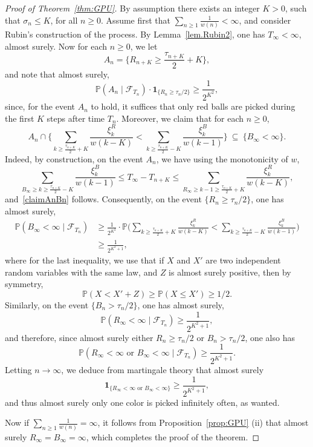 \documentclass[11pt]{article}
\newcommand{\1}{{\text{\Large $\mathfrak 1$}}}
\begin{document}
\begin{proof}[Proof of Theorem~\ref{thm:GPU}]
By assumption there exists an integer $K>0$, such that $\sigma_n\le K$, for all $n\ge 0$. Assume first that $\sum_{n\ge 1} \frac 1{w(n)}<\infty$, and consider Rubin's construction of the process. 
By Lemma~\ref{lem.Rubin2}, one has $T_\infty<\infty$, almost surely. Now for each $n\ge 0$, we let  
$$A_n = \big\{R_{n+K} \ge \frac{\tau_{n+K}}2 + K\big\},$$
and note that almost surely, 
\begin{equation}\label{prob.An}
\mathbb P(A_n\mid  \mathcal F_{T_n})\cdot \mathbf 1_{\{R_n \ge \tau_n/ 2 \}} \ge \frac{1}{2^{K^2}},
\end{equation}
since, for the event $A_n$ to hold, it suffices that only red balls are picked during the first $K$ steps after time $T_n$. Moreover, we claim that for each $n\ge 0$, 
\begin{equation}\label{claimAnBn}
A_n \cap \Big\{\sum_{k \ge \frac{\tau_{n+K}}{2} + K}  \frac{\xi_k^R}{w(k-K)}<\sum_{k \ge\frac{\tau_{n+K}}{2} - K} \frac{\xi_k^B}{w(k-1)}\Big\} \ \subseteq \ \{B_\infty<\infty\}. 
\end{equation}
Indeed, by construction, on the event $A_n$, we have using the monotonicity of $w$, 
$$ \sum_{B_\infty \ge k \ge  \frac{\tau_{n+K}}{2} - K}  \frac{\xi_k^B}{w(k-1)}\le T_\infty- T_{n+K} \le \sum_{R_\infty  \ge k-1 \ge \frac{\tau_{n+K}}{2} + K}  \frac{\xi_k^R}{w(k-K)},$$
and~\eqref{claimAnBn} follows. Consequently, on the event $\{R_n \ge \tau_n/ 2 \}$, one has almost surely, 
\begin{align*}
\mathbb P(B_\infty<\infty\mid\mathcal F_{T_n})  & \ge  \frac{1}{2^{K^2}} \cdot \mathbb P\Big(\sum_{k \ge \frac{\tau_{n+K}}{2} + K}  \frac{\xi_k^R}{w(k-K)}<\sum_{k \ge\frac{\tau_{n+K}}{2} - K} \frac{\xi_k^B}{w(k-1)}\Big) \\ 
&  \ge  \frac{1}{2^{K^2+1}}, 
\end{align*}
where for the last inequality, we use that if $X$ and $X'$ are two independent random variables with the same law, and $Z$ is almost surely positive, then by symmetry, 
$$\mathbb P(X<X' + Z) \ge \mathbb P(X\le X') \ge 1/2.$$  
Similarly, on the event $\{B_n >\tau_n/ 2 \}$, one has almost surely, 
$$\mathbb P(R_\infty<\infty\mid\mathcal F_{T_n}) \ge \frac{1}{2^{K^2+1}}, $$
and therefore, since almost surely either $R_n\ge \tau_n/2$ or $B_n > \tau_n / 2$, one also has 
$$\mathbb P(R_\infty<\infty\text{ or }B_\infty<\infty \mid\mathcal F_{T_n}) \ge \frac{1}{2^{K^2+1}}. $$ 
Letting $n\to \infty$, we deduce from martingale theory that almost surely 
$$\mathbf 1_{\{R_\infty<\infty\text{ or }B_\infty<\infty \}} \ge  \frac{1}{2^{K^2+1}}, $$ 
and thus almost surely only one color is picked infinitely often, as wanted. 


Now if $\sum_{n\ge 1} \frac 1{w(n)} = \infty$, it follows from Proposition~\ref{prop:GPU} (ii) that almost surely $R_\infty = B_\infty = \infty$, which completes the proof of the theorem. 
\end{proof}
\end{document}
